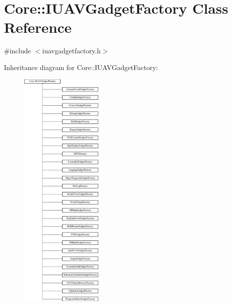 \hypertarget{class_core_1_1_i_u_a_v_gadget_factory}{\section{\-Core\-:\-:\-I\-U\-A\-V\-Gadget\-Factory \-Class \-Reference}
\label{class_core_1_1_i_u_a_v_gadget_factory}
}


{\ttfamily \#include $<$iuavgadgetfactory.\-h$>$}

\-Inheritance diagram for \-Core\-:\-:\-I\-U\-A\-V\-Gadget\-Factory\-:\begin{figure}[H]
\begin{center}
\leavevmode
\includegraphics[height=12.000000cm]{class_core_1_1_i_u_a_v_gadget_factory}
\end{center}
\end{figure}

